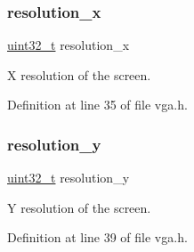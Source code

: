 \subsubsection{\texorpdfstring{resolution\+\_\+x}{resolution\_x}}
{\footnotesize\ttfamily \hyperlink{a00134_a435d1572bf3f880d55459d9805097f62_a435d1572bf3f880d55459d9805097f62}{uint32\+\_\+t} resolution\+\_\+x}



X resolution of the screen. 



Definition at line 35 of file vga.\+h.

\mbox{\label{a00059_ae49a6d814879c8efb7206d3d96412c4f_ae49a6d814879c8efb7206d3d96412c4f}} 
\subsubsection{\texorpdfstring{resolution\+\_\+y}{resolution\_y}}
{\footnotesize\ttfamily \hyperlink{a00134_a435d1572bf3f880d55459d9805097f62_a435d1572bf3f880d55459d9805097f62}{uint32\+\_\+t} resolution\+\_\+y}



Y resolution of the screen. 



Definition at line 39 of file vga.\+h.

